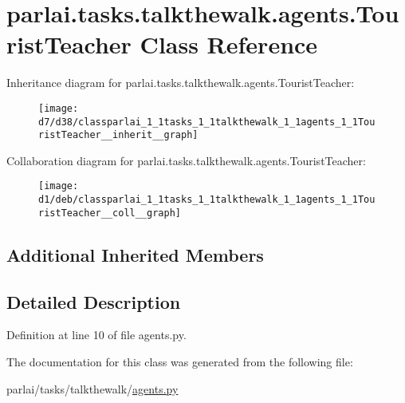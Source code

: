 \hypertarget{classparlai_1_1tasks_1_1talkthewalk_1_1agents_1_1TouristTeacher}{}\section{parlai.\+tasks.\+talkthewalk.\+agents.\+Tourist\+Teacher Class Reference}
\label{classparlai_1_1tasks_1_1talkthewalk_1_1agents_1_1TouristTeacher}


Inheritance diagram for parlai.\+tasks.\+talkthewalk.\+agents.\+Tourist\+Teacher\+:\nopagebreak
\begin{figure}[H]
\begin{center}
\leavevmode
\texttt{[image: d7/d38/classparlai\_1\_1tasks\_1\_1talkthewalk\_1\_1agents\_1\_1TouristTeacher\_\_inherit\_\_graph]}
\end{center}
\end{figure}


Collaboration diagram for parlai.\+tasks.\+talkthewalk.\+agents.\+Tourist\+Teacher\+:\nopagebreak
\begin{figure}[H]
\begin{center}
\leavevmode
\texttt{[image: d1/deb/classparlai\_1\_1tasks\_1\_1talkthewalk\_1\_1agents\_1\_1TouristTeacher\_\_coll\_\_graph]}
\end{center}
\end{figure}
\subsection*{Additional Inherited Members}


\subsection{Detailed Description}


Definition at line 10 of file agents.\+py.



The documentation for this class was generated from the following file\+:\begin{DoxyCompactItemize}
\item 
parlai/tasks/talkthewalk/\hyperlink{parlai_2tasks_2talkthewalk_2agents_8py}{agents.\+py}\end{DoxyCompactItemize}
